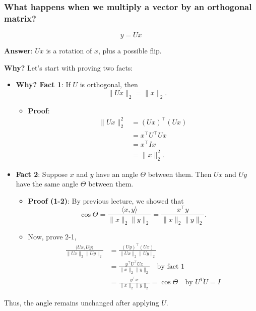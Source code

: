 \subsubsection{What happens when we multiply a vector by an orthogonal matrix?}
\begin{derivation}
\[
y = Ux
\]

\textbf{Answer}: $Ux$ is a rotation of $x$, plus a possible flip.
\vspace{1em}

\textbf{Why?} Let's start with proving two facts:
\begin{itemize}
    \item \textbf{Why? Fact 1}: If $U$ is orthogonal, then 
    \[
    \| Ux \|_2 = \| x \|_2.
    \]
    \begin{itemize}
        \item \textbf{Proof}: 
        \begin{align*}
        \| Ux \|_2^2 &= (Ux)^\top (Ux) \\
        &= x^\top U^\top U x \\
        &= x^\top I x \\
        &= \| x \|_2^2.
        \end{align*}
    \end{itemize}
    
    \item \textbf{Fact 2}: Suppose $x$ and $y$ have an angle $\Theta$ between them. Then $Ux$ and $Uy$ have the same angle $\Theta$ between them.
    
    \begin{itemize}
        \item \textbf{Proof (1-2)}: By previous lecture, we showed that 
        \[
        \cos \Theta = \frac{\langle x, y \rangle}{\| x \|_2 \| y \|_2}
        = \frac{x^\top y}{\| x \|_2 \| y \|_2}.
        \]
        \item Now, prove 2-1,
        \begin{align*}
        \frac{\langle Ux, Uy \rangle}{\| Ux \|_2 \| Uy \|_2} 
        &= \frac{(Uy)^\top (Ux)}{\| Ux \|_2 \| Uy \|_2} \\
        &= \frac{y^\top U^\top U x}{\| x \|_2 \| y \|_2} \quad \text{by fact 1} \\ 
        &= \frac{y^\top x}{\| x \|_2 \| y \|_2} = \cos \Theta \quad \text{by $U^T U = I$}
        \end{align*}
    \end{itemize}
\end{itemize}
\vspace{1em}

Thus, the angle remains unchanged after applying $U$.

\end{derivation}

